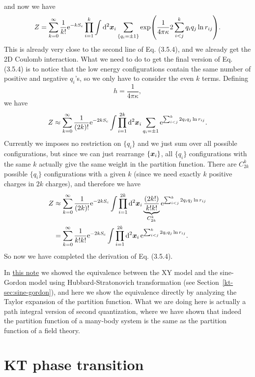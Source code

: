 \documentclass[hyperref, a4paper]{article}
\newcommand*{\ee}{\mathrm{e}}
\newcommand{\ktnote}{\href{../topological-phases-reading-notes/kt.pdf}{this note}}
\begin{document}
and now we have 
\begin{equation}
    Z = \sum_{k=0}^\infty \frac{1}{k!} \ee^{- k S_\text{c}} \prod_{i=1}^k \int \dd[2]{\vb*{x}_i} \sum_{\{q_i = \pm 1\}} \exp(\frac{1}{4 \pi \kappa} 2 \sum_{i < j}^k q_i q_j \ln r_{ij}).
\end{equation}
This is already very close to the second line of Eq. (3.5.4), and we already get the 2D Coulomb interaction. 
What we need to do to get the final version of Eq. (3.5.4) is to notice that the low energy configurations 
contain the same number of positive and negative $q_i$'s, so we only have to consider the even $k$ terms. 
Defining
\begin{equation}
    h = \frac{1}{4 \pi \kappa},
\end{equation}
we have 
\[
    Z \approx \sum_{k=0}^\infty \frac{1}{(2k)!} \ee^{- 2 k S_\text{c}} \int \prod_{i=1}^{2k} \dd[2]{\vb*{x}_i} \sum_{q_i = \pm 1} \ee^{\sum_{i < j}^k 2 q_i q_j \ln r_{ij}}.
\]
Currently we imposes no restriction on $\{q_i\}$ and we just sum over all possible configurations, but since 
we can just rearrange $\{\vb*{x}_i\}$, all $\{q_i\}$ configurations with the same $k$ actually give the same 
weight in the partition function. There are $C_{2k}^k$ possible $\{q_i\}$ configurations with a given $k$ (since
we need exactly $k$ positive charges in $2k$ charges), and therefore we have 
\[
    \begin{aligned}
        Z &\approx \sum_{k=0}^\infty \frac{1}{(2k)!} \ee^{- 2 k S_\text{c}} \int \prod_{i=1}^{2k} \dd[2]{\vb*{x}_i} \underbrace{\frac{(2k!)}{k! k!}}_{C_{2k}^k} \ee^{\sum_{i < j}^k 2 q_i q_j \ln r_{ij}} \\
        &= \sum_{k=0}^\infty \frac{1}{k! k!} \ee^{- 2 k S_\text{c}} \int \prod_{i=1}^{2k} \dd[2]{\vb*{x}_i} \ee^{\sum_{i < j}^k 2 q_i q_j \ln r_{ij}}.
    \end{aligned}
\]
So now we have completed the derivation of Eq. (3.5.4).

In \ktnote{} we showed the equivalence between the XY model and the sine-Gordon model using Hubbard-Stratonovich
transformation (see Section~\ref{kt-sec:sine-gordon}), and here we show the equivalence directly by analyzing 
the Taylor expansion of the partition function. What we are doing here is actually a path integral version of 
second quantization, where we have shown that indeed the partition function of a many-body system is the 
same as the partition function of a field theory. 

\section{KT phase transition}



 
\end{document}

